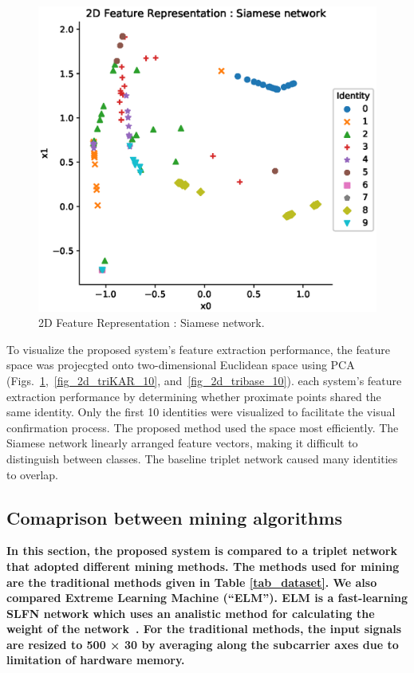 \begin{figure}[!ht]
    \includegraphics[width=\textwidth]{fig_2d_siam_10_v1.eps}
    \caption{2D Feature Representation : Siamese network.} \label{fig_2d_siam_10}
\end{figure}
To visualize the proposed system's feature extraction performance, the feature space was projecgted onto two-dimensional Euclidean space using PCA (Figs.~\ref{fig_2d_siam_10},~\ref{fig_2d_triKAR_10}, and~\ref{fig_2d_tribase_10}). each system's feature extraction performance by determining whether proximate points shared the same identity. Only the first 10 identities were visualized to facilitate the visual confirmation process.
The proposed method used the space most efficiently. The Siamese network linearly arranged feature vectors, making it difficult to distinguish between classes. The baseline triplet network caused many identities to overlap.
\fi
\subsection{Comaprison between mining algorithms}
\textbf{
In this section, the proposed system is compared to a triplet network that adopted different mining methods. The methods used for mining are the traditional methods given in Table \ref{tab_dataset}. 
We also compared Extreme Learning Machine (``ELM'').
ELM is a fast-learning SLFN network which uses an analistic method for calculating the weight of the network~\cite{huang2006extreme}.
For the traditional methods, the input signals are resized to 500 × 30 by averaging along the subcarrier axes due to limitation of hardware memory.}

